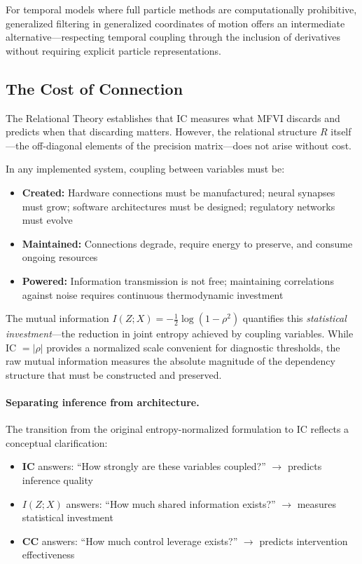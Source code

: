 \documentclass[10pt]{article} %
\theoremstyle{plain}
\theoremstyle{definition}
\begin{document}
\noindent For temporal models where full particle methods are computationally prohibitive, generalized filtering in generalized coordinates of motion offers an intermediate alternative---respecting temporal coupling through the inclusion of derivatives without requiring explicit particle representations.

\subsection{The Cost of Connection}
\label{sec:cost-of-connection}

The Relational Theory establishes that IC measures what MFVI discards and predicts when that discarding matters. However, the relational structure $R$ itself---the off-diagonal elements of the precision matrix---does not arise without cost.

In any implemented system, coupling between variables must be:
\begin{itemize}
    \item \textbf{Created:} Hardware connections must be manufactured; neural synapses must grow; software architectures must be designed; regulatory networks must evolve
    \item \textbf{Maintained:} Connections degrade, require energy to preserve, and consume ongoing resources
    \item \textbf{Powered:} Information transmission is not free; maintaining correlations against noise requires continuous thermodynamic investment
\end{itemize}

\noindent The mutual information $I(Z;X) = -\frac{1}{2}\log(1 - \rho^2)$ quantifies this \emph{statistical investment}---the reduction in joint entropy achieved by coupling variables. While IC $= |\rho|$ provides a normalized scale convenient for diagnostic thresholds, the raw mutual information measures the absolute magnitude of the dependency structure that must be constructed and preserved.

\paragraph{Separating inference from architecture.} The transition from the original entropy-normalized formulation to IC reflects a conceptual clarification:
\begin{itemize}
    \item \textbf{IC} answers: ``How strongly are these variables coupled?'' $\rightarrow$ predicts inference quality
    \item \textbf{$I(Z;X)$} answers: ``How much shared information exists?'' $\rightarrow$ measures statistical investment  
    \item \textbf{CC} answers: ``How much control leverage exists?'' $\rightarrow$ predicts intervention effectiveness
\end{itemize}
\end{document}
